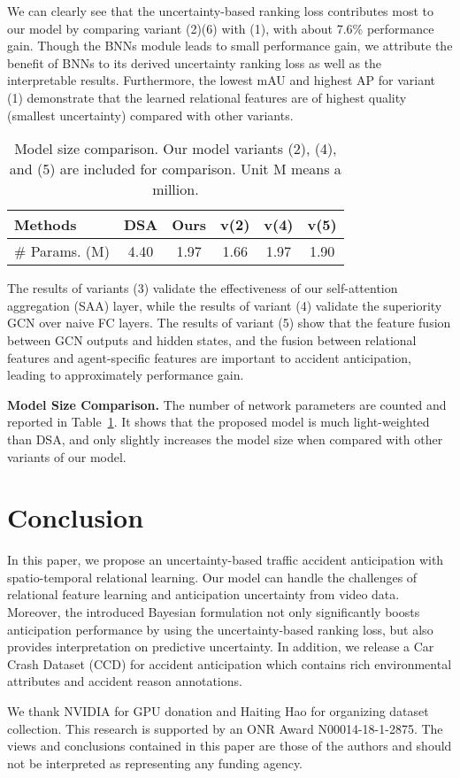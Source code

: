 \documentclass[sigconf]{acmart}
\begin{document}
We can clearly see that the uncertainty-based ranking loss contributes most to our model by comparing variant (2)(6) with (1), with about 7.6\% performance gain. Though the BNNs module leads to small performance gain, we attribute the benefit of BNNs to its derived uncertainty ranking loss as well as the interpretable results. Furthermore, the lowest mAU and highest AP for variant (1) demonstrate that the learned relational features are of highest quality (smallest uncertainty) compared with other variants.

\begin{table}
\centering
\setlength{\tabcolsep}{3.0mm}
\caption{Model size comparison. Our model variants (2), (4), and (5) are included for comparison. Unit M means a million.}
\label{tab:size}
\normalsize
\begin{tabular}{l|c|c|c|c|c}
\hline
Methods &DSA &Ours & v(2) & v(4) & v(5) \\
\hline
\# Params. (M) &4.40 &1.97 &1.66 &1.97 &1.90 \\
\hline
\end{tabular}
\end{table}

The results of variants (3) validate the effectiveness of our self-attention aggregation (SAA) layer, while the results of variant (4) validate the superiority GCN over naive FC layers. The results of variant (5) show that the feature fusion between GCN outputs and hidden states, and the fusion between relational features and agent-specific features are important to accident anticipation, leading to approximately  performance gain.

\textbf{Model Size Comparison.} The number of network parameters are counted and reported in Table~\ref{tab:size}. It shows that the proposed model is much light-weighted than DSA, and only slightly increases the model size when compared with other variants of our model.

\section{Conclusion}

In this paper, we propose an uncertainty-based traffic accident anticipation with spatio-temporal relational learning. Our model can handle the challenges of relational feature learning and anticipation uncertainty from video data. Moreover, the introduced Bayesian formulation not only significantly boosts anticipation performance by using the uncertainty-based ranking loss, but also provides interpretation on predictive uncertainty. In addition, we release a Car Crash Dataset (CCD) for accident anticipation which contains rich environmental attributes and accident reason annotations.

\begin{acks}
 We thank NVIDIA for GPU donation and Haiting Hao for organizing dataset collection. This research is supported by an ONR Award N00014-18-1-2875. The views and conclusions contained in this paper are those of the authors and should not be interpreted as representing any funding agency.
\end{acks}

\clearpage
\balance


\end{document}
